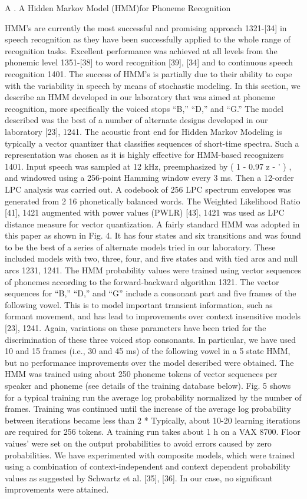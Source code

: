 A . A Hidden Markov Model (HMM)for Phoneme Recognition


HMM’s are currently the most successful and promising approach 1321-[34] in speech recognition as they have been successfully applied to the whole range of recognition tasks. 
Excellent performance was achieved at all levels from the phonemic level 1351-[38] to word recognition [39], [34] and to continuous speech recognition 1401. 
The success of HMM’s is partially due to their ability to cope with the variability in speech by means of stochastic modeling. In this section, we describe an HMM developed in our laboratory that was aimed at phoneme recognition, more specifically the voiced stops “B,” “D,” and “G.”
The model described was the best of a number of alternate designs developed in our laboratory [23], 1241.
The acoustic front end for Hidden Markov Modeling is typically a vector quantizer that classifies sequences of short-time spectra. 
Such a representation was chosen as it is highly effective for HMM-based recognizers 1401.
Input speech was sampled at 12 kHz, preemphasized by ( 1 - 0.97 z - ’ ) , and windowed using a 256-point Hamming window every 3 ms. 
Then a 12-order LPC analysis was carried out. 
A codebook of 256 LPC spectrum envelopes was generated from 2 16 phonetically balanced words. 
The Weighted Likelihood Ratio [41], 1421 augmented with power values (PWLR) [43], 1421 was used as LPC distance measure for vector quantization.
A fairly standard HMM was adopted in this paper as shown in Fig. 4. 
It has four states and six transitions and was found to be the best of a series of alternate models tried in our laboratory. 
These included models with two, three, four, and five states and with tied arcs and null arcs 1231, 1241.
The HMM probability values were trained using vector sequences of phonemes according to the forward-backward algorithm 1321. 
The vector sequences for “B,” “D,” and “G” include a consonant part and five frames of the following vowel. 
This is to model important transient information, such as formant movement, and has lead to improvements over context insensitive models [23], 1241. 
Again, variations on these parameters have been tried for the discrimination of these three voiced stop consonants. 
In particular, we have used 10 and 15 frames (i.e., 30 and 45 ms) of the following vowel in a 5 state HMM, but no performance improvements over the model described were obtained.
The HMM was trained using about 250 phoneme tokens of vector sequences per speaker and phoneme (see details of the training database below). 
Fig. 5 shows for a typical training run the average log probability normalized by the number of frames. 
Training was continued until the increase of the average log probability between iterations became less than 2 *
Typically, about 10-20 learning iterations are required for 256 tokens. 
A training run takes about 1 h on a VAX 8700. 
Floor vaiues’ were set on the output probabilities to avoid errors caused by zero probabilities. 
We have experimented with composite models, which were trained using a combination of context-independent and context dependent probability values as suggested by Schwartz et al. [35], [36]. 
In our case, no significant improvements were attained.


